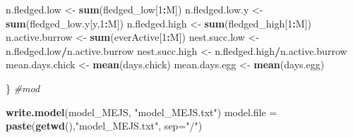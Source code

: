 \documentclass[]{article}
\newenvironment{Shaded}{\begin{snugshade}}{\end{snugshade}}
\newcommand{\KeywordTok}[1]{\textcolor[rgb]{0.13,0.29,0.53}{\textbf{#1}}}
\newcommand{\DataTypeTok}[1]{\textcolor[rgb]{0.13,0.29,0.53}{#1}}
\newcommand{\DecValTok}[1]{\textcolor[rgb]{0.00,0.00,0.81}{#1}}
\newcommand{\StringTok}[1]{\textcolor[rgb]{0.31,0.60,0.02}{#1}}
\newcommand{\CommentTok}[1]{\textcolor[rgb]{0.56,0.35,0.01}{\textit{#1}}}
\newcommand{\OperatorTok}[1]{\textcolor[rgb]{0.81,0.36,0.00}{\textbf{#1}}}
\newcommand{\NormalTok}[1]{#1}
\begin{document}
\begin{Shaded}
\begin{Highlighting}[]
\NormalTok{n.fledged.low <-}\StringTok{ }\KeywordTok{sum}\NormalTok{(fledged_low[}\DecValTok{1}\OperatorTok{:}\NormalTok{M])}
\NormalTok{n.fledged.low.y <-}\StringTok{ }\KeywordTok{sum}\NormalTok{(fledged_low.y[y,}\DecValTok{1}\OperatorTok{:}\NormalTok{M])}
\NormalTok{n.fledged.high <-}\StringTok{ }\KeywordTok{sum}\NormalTok{(fledged_high[}\DecValTok{1}\OperatorTok{:}\NormalTok{M])}
\NormalTok{n.active.burrow <-}\StringTok{ }\KeywordTok{sum}\NormalTok{(everActive[}\DecValTok{1}\OperatorTok{:}\NormalTok{M])}
\NormalTok{nest.succ.low <-}\StringTok{ }\NormalTok{n.fledged.low}\OperatorTok{/}\NormalTok{n.active.burrow}
\NormalTok{nest.succ.high <-}\StringTok{ }\NormalTok{n.fledged.high}\OperatorTok{/}\NormalTok{n.active.burrow}
\NormalTok{mean.days.chick <-}\StringTok{ }\KeywordTok{mean}\NormalTok{(days.chick)}
\NormalTok{mean.days.egg <-}\StringTok{ }\KeywordTok{mean}\NormalTok{(days.egg)}

\NormalTok{\} }\CommentTok{#mod}

\KeywordTok{write.model}\NormalTok{(model_MEJS, }\StringTok{"model_MEJS.txt"}\NormalTok{)}
\NormalTok{model.file =}\StringTok{ }\KeywordTok{paste}\NormalTok{(}\KeywordTok{getwd}\NormalTok{(),}\StringTok{"model_MEJS.txt"}\NormalTok{, }\DataTypeTok{sep=}\StringTok{"/"}\NormalTok{)}
\end{Highlighting}
\end{Shaded}
\end{document}
